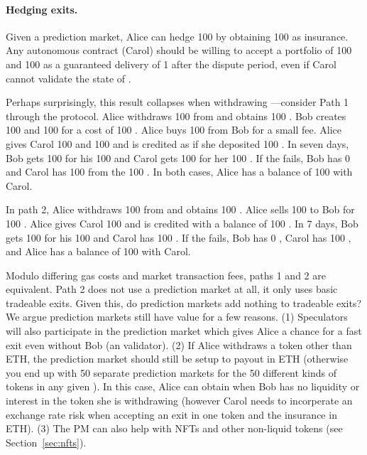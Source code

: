 \paragraph{Hedging exits.} Given a prediction market, Alice can hedge 100 \ethxx by obtaining 100 \fail as insurance. Any autonomous \layerone contract (Carol) should be willing to accept a portfolio of 100 \ethxx and 100 \fail as a guaranteed delivery of 1 \ethone after the dispute period, even if Carol cannot validate the state of \layertwo.  

Perhaps surprisingly, this result collapses when withdrawing \ethtwo---consider Path 1 through the protocol. Alice withdraws 100 \ethtwo from \layertwo and obtains 100 \ethxx. Bob creates 100 \fail and 100 \final for a cost of 100 \ethone. Alice buys 100 \fail from Bob for a small fee. Alice gives Carol 100 \ethxx and 100 \fail and is credited as if she deposited 100 \ethone. In seven days, Bob gets 100 \ethone for his 100 \final and Carol gets 100 \ethone for her 100 \ethxx. If the \rblock fails, Bob has 0 \ethone and Carol has 100 \ethone from the 100 \fail. In both cases, Alice has a balance of 100 \ethone with Carol. 

In path 2, Alice withdraws 100 \ethtwo from \layertwo and obtains 100 \ethxx. Alice sells 100 \ethxx to Bob for 100 \ethone. Alice gives Carol 100 \ethone and is credited with a balance of 100 \ethone. In 7 days, Bob gets 100 \ethone for his 100 \ethxx and Carol has 100 \ethone. If the \rblock fails, Bob has 0 \ethone, Carol has 100 \ethone, and Alice has a balance of 100 \ethone with Carol.

Modulo differing gas costs and market transaction fees, paths 1 and 2 are equivalent. Path 2 does not use a prediction market at all, it only uses basic tradeable exits. Given this, do prediction markets add nothing to tradeable exits? We argue prediction markets still have value for a few reasons. (1) Speculators will also participate in the prediction market which gives Alice a chance for a fast exit even without Bob (an \layertwo validator). (2) If Alice withdraws a token other than ETH, the prediction market should still be setup to payout in ETH (otherwise you end up with 50 separate prediction markets for the 50 different kinds of tokens in any given \rblock). In this case, Alice can obtain \fail when Bob has no liquidity or interest in the token she is withdrawing (however Carol needs to incorperate an exchange rate risk when accepting an exit in one token and the insurance in ETH). (3) The PM can also help with NFTs and other non-liquid tokens (see Section~\ref{sec:nfts}).

